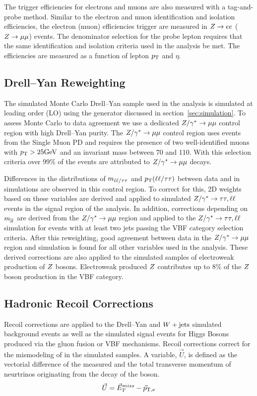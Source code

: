 The trigger efficiencies for electrons and muons are also measured with a tag-and-probe method.
Similar to the electron and muon identification and isolation efficiencies, the 
electron (muon) efficiencies trigger are measured in $Z\to ee$ ($Z\to\mu\mu$) events.
The denominator selection for the probe lepton requires that the same identification and
isolation criteria used in the analysis be met. The efficiencies are measured as a function of
lepton $p_\mathrm{T}$ and $\eta$.



\subsection{Drell--Yan Reweighting}
\label{sec:htt_dy_reweighting}
The simulated Monte Carlo Drell--Yan sample used in the analysis is simulated at leading order (LO)
using the \aMCATNLO generator discussed in section~\ref{sec:simulation}. To assess Monte Carlo to
data agreement we use a dedicated $Z/\gamma^*\to\mu\mu$ control region with high Drell--Yan purity.
The $Z/\gamma^*\to\mu\mu$ control region uses events from the Single Muon PD and requires the 
presence of two well-identified muons with $p_\mathrm{T} > 25 \mathrm{GeV}$ and an invariant mass between 70 and 110\GeV.
With this selection criteria over 99\% of the events are attributed to $Z/\gamma^*\to\mu\mu$ decays.

Differences in the distributions of $m_{\ell\ell/\tau\tau}$ and $p_\mathrm{T}(\ell\ell/\tau\tau)$ between data and 
in simulations are observed in this control region. To correct for this, 2D weights based on these variables 
are derived and applied to simulated $Z/\gamma^*\to\tau\tau, \ell\ell$ events in the signal region of the analysis. 
In addition, corrections depending on $m_\mathrm{jj}$ are derived from the $Z/\gamma^*\to\mu\mu$ region and 
applied to the $Z/\gamma^*\to\tau\tau, \ell\ell$ simulation for events with at least two jets passing the 
VBF category selection criteria. After this reweighting, good agreement between data in the 
$Z/\gamma^*\to\mu\mu$ region and simulation is found for all other variables used in the analysis.
These derived corrections are also applied to the simulated samples of electroweak production of $Z$ 
bosons. Electroweak produced $Z$ contributes up to 8\% of the $Z$ boson production in the VBF category.



\subsection{Hadronic Recoil Corrections}
Recoil corrections are applied to the Drell--Yan and $W+\text{jets}$ simulated background events 
as well as the simulated signal events for 
Higgs Bosons produced via the gluon fusion or VBF mechanisms. Recoil corrections correct for the
mismodeling of \etvecmiss in the simulated samples. A variable, $\vec{U}$, is defined as the 
vectorial difference of the measured \etvecmiss and the total transverse momentum of neurtrinos
originating from the decay of the boson.
\begin{equation}
\vec{U} = \vec{E}^{miss}_T - \vec{p}_{\text{T},\nu}
\end{equation}

